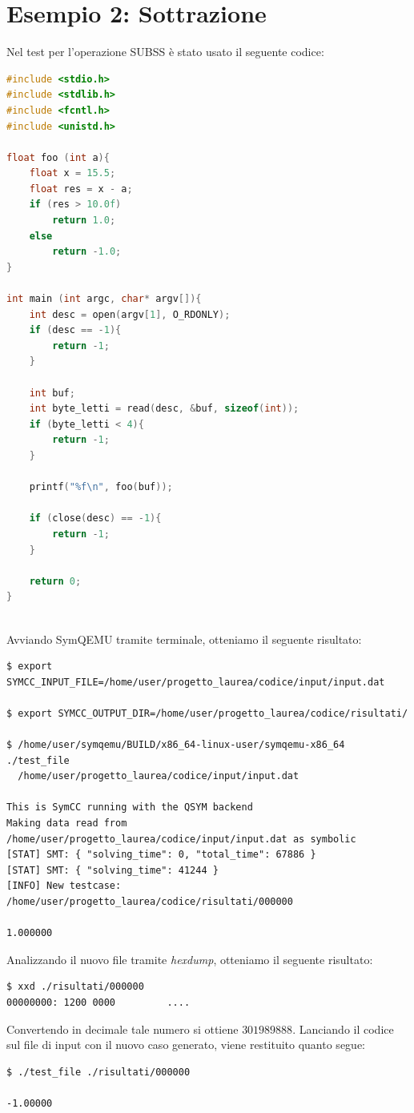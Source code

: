 \documentclass[Lau, oneside]{sapthesis}%
\begin{document}
\section{Esempio 2: Sottrazione}
Nel test per l'operazione SUBSS è stato usato il seguente codice:
\newline
\begin{lstlisting}[xleftmargin=0\textwidth, language=C, basicstyle=\small]
#include <stdio.h>
#include <stdlib.h>
#include <fcntl.h>
#include <unistd.h>

float foo (int a){
    float x = 15.5;
    float res = x - a;
    if (res > 10.0f)
        return 1.0;
    else 
        return -1.0;
}

int main (int argc, char* argv[]){
    int desc = open(argv[1], O_RDONLY);
    if (desc == -1){
        return -1;
    }

    int buf;
    int byte_letti = read(desc, &buf, sizeof(int));
    if (byte_letti < 4){
        return -1;
    }

    printf("%f\n", foo(buf));

    if (close(desc) == -1){
        return -1;
    }

    return 0;
}
\end{lstlisting}
\ \\ \newline
Avviando SymQEMU tramite terminale, otteniamo il seguente risultato:
\begin{lstlisting}[xleftmargin=0\textwidth, basicstyle=\footnotesize]
$ export SYMCC_INPUT_FILE=/home/user/progetto_laurea/codice/input/input.dat

$ export SYMCC_OUTPUT_DIR=/home/user/progetto_laurea/codice/risultati/

$ /home/user/symqemu/BUILD/x86_64-linux-user/symqemu-x86_64  ./test_file 
  /home/user/progetto_laurea/codice/input/input.dat

This is SymCC running with the QSYM backend
Making data read from /home/user/progetto_laurea/codice/input/input.dat as symbolic
[STAT] SMT: { "solving_time": 0, "total_time": 67886 }
[STAT] SMT: { "solving_time": 41244 }
[INFO] New testcase: /home/user/progetto_laurea/codice/risultati/000000

1.000000
\end{lstlisting}


\newpage
Analizzando il nuovo file tramite \textit{hexdump}, otteniamo il seguente risultato:
\begin{lstlisting}[xleftmargin=0\textwidth, language=bash]
$ xxd ./risultati/000000
00000000: 1200 0000         ....
\end{lstlisting}
Convertendo in decimale tale numero si ottiene $301989888$.
\newline \newline
Lanciando il codice sul file di input con il nuovo caso generato, viene restituito quanto segue:
\begin{lstlisting}[xleftmargin=0\textwidth, language=bash]
$ ./test_file ./risultati/000000

-1.00000
\end{lstlisting}
\end{document}
